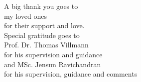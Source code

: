 


	\begin{center}
		A big thank you goes to\\\vspace{20pt}
		my loved ones \\
		for their support and love.\\ \vspace{20pt}
		Special gratitude goes to \\\vspace{20pt}
		Prof. Dr. Thomas Villmann\\
		for his supervision and guidance\\
		and MSc. Jensun Ravichandran \\ for his supervision, guidance and comments
	\end{center}